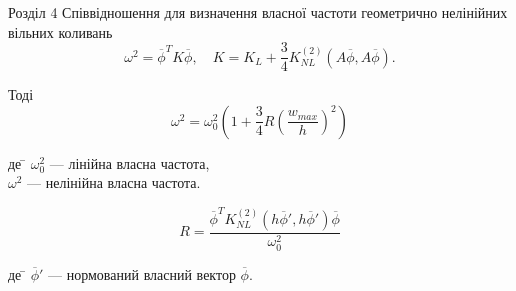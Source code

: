 \documentclass[8pt]{beamer}
\numberwithin{figure}{section}
\numberwithin{equation}{section}
\numberwithin{table}{section}
\begin{document}
\begin{frame}{Розділ 4}
Співвідношення для визначення власної частоти геометрично нелінійних вільних коливань
\begin{equation}
\omega^2=\overline{\phi}^T K \overline{\phi}, \quad K = K_L + \frac34 K_{NL}^{(2)}\left( A\overline{\phi},A\overline{\phi} \right).
\end{equation}

Тоді
\begin{equation}
\omega^2=\omega_0^2\left(1+\frac{3}{4}R\left(\frac{w_{max}}{h}\right)^2\right)
\end{equation}

\begin{tabbing}
де \= $\omega_0^2$ --- лінійна власна частота,\\
\> $\omega^2$ --- нелінійна власна частота.
\end{tabbing}

\begin{equation}
R=\frac{\overline{\phi}^T K_{NL}^{(2)}\left( h\overline{\phi}',h\overline{\phi}' \right) \overline{\phi}}{\omega_0^2}
\end{equation}

\begin{tabbing}
де \= $\overline{\phi}'$ --- нормований власний вектор $\overline{\phi}$.
\end{tabbing}


\end{frame}
\end{document}
